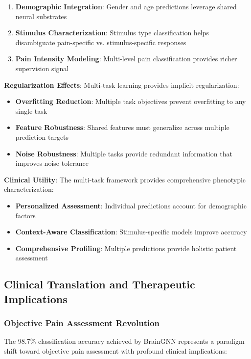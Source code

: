 \begin{enumerate}
\item \textbf{Demographic Integration}: Gender and age predictions leverage shared neural substrates
\item \textbf{Stimulus Characterization}: Stimulus type classification helps disambiguate pain-specific vs. stimulus-specific responses
\item \textbf{Pain Intensity Modeling}: Multi-level pain classification provides richer supervision signal
\end{enumerate}

\textbf{Regularization Effects}:
Multi-task learning provides implicit regularization:

\begin{itemize}
\item \textbf{Overfitting Reduction}: Multiple task objectives prevent overfitting to any single task
\item \textbf{Feature Robustness}: Shared features must generalize across multiple prediction targets
\item \textbf{Noise Robustness}: Multiple tasks provide redundant information that improves noise tolerance
\end{itemize}

\textbf{Clinical Utility}:
The multi-task framework provides comprehensive phenotypic characterization:

\begin{itemize}
\item \textbf{Personalized Assessment}: Individual predictions account for demographic factors
\item \textbf{Context-Aware Classification}: Stimulus-specific models improve accuracy
\item \textbf{Comprehensive Profiling}: Multiple predictions provide holistic patient assessment
\end{itemize}

\subsection{Clinical Translation and Therapeutic Implications}

\subsubsection{Objective Pain Assessment Revolution}

The 98.7\% classification accuracy achieved by BrainGNN represents a paradigm shift toward objective pain assessment with profound clinical implications:

